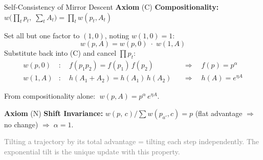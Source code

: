 \documentclass[aspectratio=169,11pt]{beamer}
\begin{document}
\begin{frame}{Self-Consistency of Mirror Descent}
\smallskip
\textbf{Axiom}\; \textcolor{accent}{(C)}\; \textbf{Compositionality:}\;
$w\!\bigl(\textstyle\prod_t p_t,\;\sum_t A_t\bigr) = \prod_t w(p_t, A_t)$

\pause
\smallskip
Set all but one factor to $(1,0)$, noting $w(1,0)=1$:
\[
  w(p,A) = w(p,0)\;\cdot\; w(1,A)
\]
\pause
Substitute back into \textcolor{accent}{(C)} and cancel $\prod p_t$:
\begin{align*}
  w(p,0)&:\quad f(p_1 p_2) = f(p_1)\,f(p_2) &&\Longrightarrow\quad f(p) = p^\alpha \\
  w(1,A)&:\quad h(A_1+A_2) = h(A_1)\,h(A_2) &&\Longrightarrow\quad h(A) = e^{\eta A}
\end{align*}
\vspace{-0.4cm}

From compositionality alone: $\;w(p,A) = p^\alpha\, e^{\eta A}$.

\pause
\medskip
\textbf{Axiom}\; \textcolor{accent}{(N)}\; \textbf{Shift Invariance:}\;
$w(p,\, c) / \sum w(p_{a'},c) = p$\;\; (flat advantage $\Rightarrow$ no change)\;\; $\Longrightarrow\;\alpha = 1$.

\pause
\smallskip
\begin{center}
\end{center}
\vspace{-0.15cm}
\small\textcolor{gray}{Tilting a trajectory by its total advantage = tilting each step independently. The exponential tilt is the unique update with this property.}
\end{frame}
\end{document}
